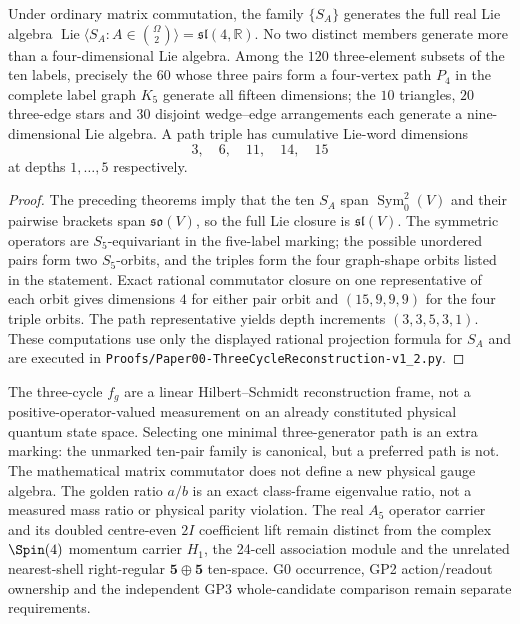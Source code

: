 \documentclass[11pt]{article}
\begin{document}
\begin{theorem}
\label{p1:thm:v342-minimal-path-lie-generators}
Under ordinary matrix commutation, the family $\{S_A\}$
generates the full real Lie algebra
$\operatorname{Lie}\langle S_A:A\in\binom\Omega2\rangle
=\mathfrak{sl}(4,\mathbb R)$.  No two distinct members generate
more than a four-dimensional Lie algebra.  Among the $120$
three-element subsets of the ten labels, precisely the $60$
whose three pairs form a four-vertex path $P_4$ in the complete
label graph $K_5$ generate all fifteen dimensions; the
$10$ triangles, $20$ three-edge stars and $30$ disjoint
wedge--edge arrangements each generate a nine-dimensional
Lie algebra.  A path triple has cumulative Lie-word dimensions
\[
 3,\quad6,\quad11,\quad14,\quad15
\]
at depths $1,\ldots,5$ respectively.
\end{theorem}
\begin{proof}
The preceding theorems imply that the ten $S_A$ span
$\operatorname{Sym}^2_0(V)$ and their pairwise brackets span
$\mathfrak{so}(V)$, so the full Lie closure is
$\mathfrak{sl}(V)$.  The symmetric operators are $S_5$-equivariant
in the five-label marking; the possible unordered pairs form
two $S_5$-orbits, and the triples form the four graph-shape orbits
listed in the statement.  Exact rational commutator closure on
one representative of each orbit gives dimensions $4$ for either
pair orbit and $(15,9,9,9)$ for the four triple orbits.
The path representative yields depth increments $(3,3,5,3,1)$.
These computations use only the displayed rational projection
formula for $S_A$ and are executed in
\texttt{Proofs/Paper00-ThreeCycleReconstruction-v1\_2.py}.
\end{proof}

\begin{remark}
\label{p1:rem:v342-class-frame-observable-firewall}
The three-cycle $f_g$ are a linear Hilbert--Schmidt reconstruction
frame, not a positive-operator-valued measurement on an already
constituted physical quantum state space.  Selecting one minimal
three-generator path is an extra marking: the unmarked ten-pair
family is canonical, but a preferred path is not.  The mathematical
matrix commutator does not define a new physical gauge algebra.
The golden ratio $a/b$ is an exact class-frame eigenvalue ratio,
not a measured mass ratio or physical parity violation.
The real $A_5$ operator carrier and its doubled centre-even
$2I$ coefficient lift remain distinct from the complex
$\Spin(4)$ momentum carrier $H_1$, the 24-cell association
module and the unrelated nearest-shell right-regular $\mathbf5
\oplus\mathbf5$ ten-space.  G0 occurrence, GP2 action/readout
ownership and the independent GP3 whole-candidate comparison
remain separate requirements.
\end{remark}
\end{document}
